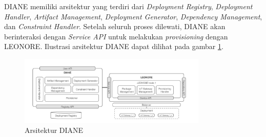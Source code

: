 DIANE memiliki arsitektur yang terdiri dari \textit{Deployment Registry}, \textit{Deployment Handler}, \textit{Artifact Management}, \textit{Deployment Generator}, \textit{Dependency Management}, dan \textit{Constraint Handler}. Setelah seluruh proses dilewati, DIANE akan berinteraksi dengan \textit{Service API} untuk melakukan \textit{provisioning} dengan LEONORE. Ilustrasi arsitektur DIANE dapat dilihat pada gambar \ref{fig:diane-arch}.

\begin{figure}[ht]
  \centering
  \includegraphics[width=0.8\textwidth]{resources/chapter-2/diane-architecture.jpg}
  \caption{Arsitektur DIANE \parencite{vogler2015diane}}
  \label{fig:diane-arch}
\end{figure}